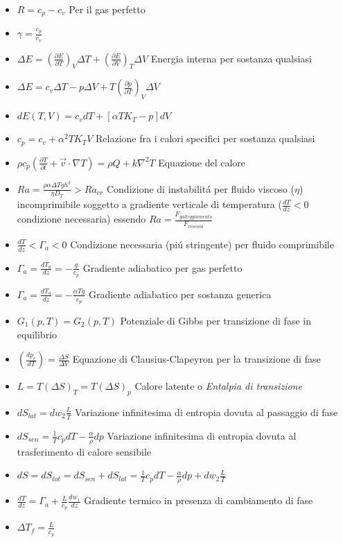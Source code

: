 \documentclass[a4paper]{article}
\begin{document}
\begin{itemize}
	\item $R=c_p-c_v$ Per il gas perfetto
	\item $\gamma=\frac{c_p}{c_v}$
	\item $\Delta E = (\frac{\partial E}{\partial T})_V \Delta T +(\frac{\partial E}{\partial V})_T \Delta V$ Energia interna per sostanza qualsiasi
	\item $\Delta E = c_v \Delta T - p\Delta V+ T(\frac{\partial p}{\partial T})_V \Delta V$
	\item $dE(T,V)=c_vdT+[\alpha T K_T-p]dV$
	\item $c_p=c_v+\alpha^2 T K_T V$ Relazione fra i calori specifici per sostanza qualsiasi
	\item $\rho c_p (\frac{\partial T}{\partial t}+\overrightarrow{v} \cdot \nabla T) = \rho Q + k \nabla^2 T$ Equazione del calore
	\item $Ra=\frac{\rho \alpha \Delta T g h^3}{\eta D_T} > Ra_{cr}$ Condizione di instabilit\'a per fluido viscoso ($\eta$) incomprimibile soggetto a gradiente verticale di temperatura ($\frac{dT}{dz}<0$ condizione necessaria) essendo $Ra=\frac{F_{galleggiamento}}{F_{viscosa}}$
	\item $\frac{dT}{dz}<\Gamma_a<0$ Condizione necessaria (pi\'u stringente) per fluido comprimibile
	\item $\Gamma_a=\frac{dT_a}{dz}=-\frac{g}{c_p}$ Gradiente adiabatico per gas perfetto
	\item $\Gamma_a = \frac{dT_a}{dz} = -\frac{\alpha T g}{c_p}$ Gradiente adiabatico per sostanza generica
	\item $G_1(p,T)=G_2(p,T)$ Potenziale di Gibbs per transizione di fase in equilibrio
	\item $(\frac{dp_e}{dT})=\frac{\Delta S}{\Delta V}$ Equazione di Clausius-Clapeyron per la transizione di fase
	\item $L=T(\Delta S)_T=T(\Delta S)_p$ Calore latente o \textit{Entalpia di transizione}
	\item $dS_{lat}=dw_2 \frac{L}{T}$ Variazione infinitesima di entropia dovuta al passaggio di fase
	\item $dS_{sen}= \frac{1}{T}c_pdT-\frac{\alpha}{\rho}dp$ Variazione infinitesima di entropia dovuta al trasferimento di calore sensibile
	\item $dS=dS_{tot}=dS_{sen}+dS_{lat} = \frac{1}{T}c_pdT-\frac{\alpha}{\rho}dp + dw_2 \frac{L}{T}$
	\item $\frac{dT}{dz}=\Gamma_a+\frac{L}{c_p} \frac{dw_1}{dz}$ Gradiente termico in presenza di cambiamento di fase
	\item $\Delta T_f = \frac{L}{c_p}$

\end{itemize}
\end{document}
